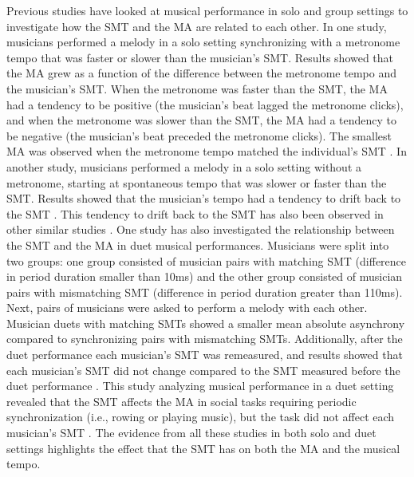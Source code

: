 \documentclass{report}
\begin{document}
Previous studies have looked at musical performance in solo and group settings to investigate how the SMT and the MA are related to each other. In one study, musicians performed a melody in a solo setting synchronizing with a metronome tempo that was faster or slower than the musician's SMT. Results showed that the MA grew as a function of the difference between the metronome tempo and the musician's SMT. When the metronome was faster than the SMT, the MA had a tendency to be positive (the musician's beat lagged the metronome clicks), and when the metronome was slower than the SMT, the MA had a tendency to be negative (the musician's beat preceded the metronome clicks). The smallest MA was observed when the metronome tempo matched the individual's SMT \cite{scheurich2018tapping}. In another study, musicians performed a melody in a solo setting without a metronome, starting at spontaneous tempo that was slower or faster than the SMT. Results showed that the musician's tempo had a tendency to drift back to the SMT \cite{zamm2018musicians}. This tendency to drift back to the SMT has also been observed in other similar studies \cite{mcauley2006time, yu2003task}. One study has also investigated the relationship between the SMT and the MA in duet musical performances. Musicians were split into two groups: one group consisted of musician pairs with matching SMT (difference in period duration smaller than 10ms) and the other group consisted of musician pairs with mismatching SMT (difference in period duration greater than 110ms). Next, pairs of musicians were asked to perform a melody with each other. Musician duets with matching SMTs showed a smaller mean absolute asynchrony compared to synchronizing pairs with mismatching SMTs. Additionally, after the duet performance each musician's SMT was remeasured, and results showed that each musician's SMT did not change compared to the SMT measured before the duet performance \cite{zamm2016endogenous}. This study analyzing musical performance in a duet setting revealed that the SMT affects the MA in social tasks requiring periodic synchronization (i.e., rowing or playing music), but the task did not affect each musician's SMT \cite{zamm2016endogenous}. The evidence from all these studies in both solo and duet settings highlights the effect that the SMT has on both the MA and the musical tempo.
\end{document}
